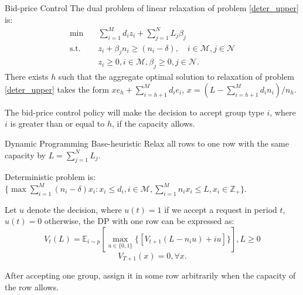       \begin{frame}{Bid-price Control}
        The dual problem of linear relaxation of problem \eqref{deter_upper} is:
        \begin{equation}\label{bid-price_dual}
          \begin{aligned}
          \min \quad & \sum_{i=1}^{M} d_i z_i + \sum_{j= 1}^{N} L_j \beta_{j} \\
          \text {s.t.} \quad & z_{i} + \beta_j n_i \geq (n_i-\delta), \quad i \in \mathcal{M}, j \in \mathcal{N} \\
          & z_{i} \geq 0, i \in \mathcal{M}, \beta_{j} \geq 0, j \in \mathcal{N}.
          \end{aligned}
        \end{equation}
        \small There exists $h$ such that the aggregate optimal solution to relaxation of problem \eqref{deter_upper} takes the form $x e_{h} + \sum_{i=h+1} ^{M} d_{i} e_{i}$, $x = (L- \sum_{i = h+1}^{M} {d_i n_i})/ n_h$.

        The bid-price control policy will make the decision to accept group type $i$, where $i$ is greater than or equal to $h$, if the capacity allows.
      \end{frame}

      \begin{frame}{Dynamic Programming Base-heuristic}
        Relax all rows to one row with the same capacity by $L = \sum_{j=1}^{N} L_j$.
        
        Deterministic problem is: $\{\max \sum_{i=1}^{M} (n_i- \delta) x_{i}: x_{i} \leq d_{i}, i \in \mathcal{M}, \sum_{i=1}^{M} n_{i} x_{i} \leq L, x_{i} \in \mathbb{Z}_{+}\}$.
        
        Let $u$ denote the decision, where $u(t) = 1$ if we accept a request in period $t$, $u(t) =0$ otherwise, the DP with one row can be expressed as:
        $$V_{t}(L) = \mathbb{E}_{i \sim p} [\max_{u \in \{0,1\}} \{ {[V_{t+1}(L-n_i u)+ i u]}\}], L \geq 0$$ 
        $$V_{T+1}(x) =0, \forall x.$$

        After accepting one group, assign it in some row arbitrarily when the capacity of the row allows.
      \end{frame}
      